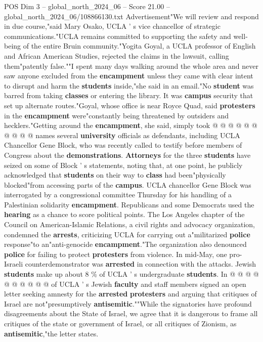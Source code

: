 \begin{textsample}{POS Dim 3 – global\_north\_2024\_06 – Score 21.00 – global\_north\_2024\_06/108866130.txt}
Advertisement"We will review and respond in due course,"said Mary Osako, UCLA ' s vice chancellor of strategic communications."UCLA remains committed to supporting the safety and well-being of the entire Bruin community."Yogita Goyal, a UCLA professor of English and African American Studies, rejected the claims in the lawsuit, calling them"patently false.""I spent many days walking around the whole area and never saw anyone excluded from the \textbf{encampment} unless they came with clear intent to disrupt and harm the \textbf{students} inside,"she said in an email."No \textbf{student} was barred from taking \textbf{classes} or entering the library.
It was \textbf{campus} security that set up alternate routes."Goyal, whose office is near Royce Quad, said \textbf{protesters} in the \textbf{encampment} were"constantly being threatened by outsiders and hecklers."Getting around the \textbf{encampment}, she said, simply took @ @ @ @ @ @ @ @ @ @ names several \textbf{university} officials as defendants, including UCLA Chancellor Gene Block, who was recently called to testify before members of Congress about the \textbf{demonstrations}. \textbf{Attorneys} for the three \textbf{students} have seized on some of Block ' s statements, noting that, at one point, he publicly acknowledged that \textbf{students} on their way to \textbf{class} had been"physically blocked"from accessing parts of the \textbf{campus}.
UCLA chancellor Gene Block was interrogated by a congressional committee Thursday for his handling of a Palestinian solidarity \textbf{encampment}.
Republicans and some Democrats used the \textbf{hearing} as a chance to score political points.
The Los Angeles chapter of the Council on American-Islamic Relations, a civil rights and advocacy organization, condemned the \textbf{arrests}, criticizing UCLA for carrying out a"militarized \textbf{police} response"to an"anti-genocide \textbf{encampment}."The organization also denounced \textbf{police} for failing to protect \textbf{protesters} from violence.
In mid-May, one pro-Israeli counterdemonstrator was \textbf{arrested} in connection with the attacks.
Jewish \textbf{students} make up about 8 \% of UCLA ' s undergraduate \textbf{students}.
In @ @ @ @ @ @ @ @ @ @ of UCLA ' s Jewish \textbf{faculty} and staff members signed an open letter seeking amnesty for the \textbf{arrested} \textbf{protesters} and arguing that critiques of Israel are not"presumptively \textbf{antisemitic}.""While the signatories have profound disagreements about the State of Israel, we agree that it is dangerous to frame all critiques of the state or government of Israel, or all critiques of Zionism, as \textbf{antisemitic},"the letter states.

\end{textsample}
